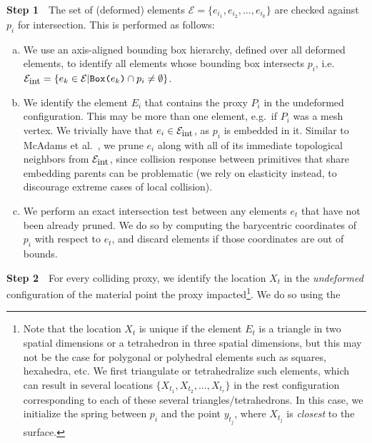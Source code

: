 \textbf{Step 1}\ \ The set of (deformed) elements $\mathcal
  E=\{e_{i_1},e_{i_2},\ldots,e_{i_k}\}$ are checked against $p_i$ for intersection. This is performed as follows:

  \begin{enumerate}[(a)]
    \vspace*{-.07in}\item We use an axis-aligned bounding box
    hierarchy, defined over all deformed elements, to identify all
    elements whose bounding box intersects $p_i$, i.e.\
    $\mathcal{E}_{\mbox{\small
        int}}=\{e_k\in\mathcal{E}|\texttt{Box(}e_k\texttt{)}\cap
    p_i\neq\emptyset\}$.

    \vspace*{-.07in}\item We identify the element $E_i$ that contains the proxy
    $P_i$ in the undeformed configuration. This may be more than one element,
    e.g.\ if $P_i$ was a mesh vertex. We trivially have that
    $e_i\in\mathcal{E}_{\mbox{\small int}}$, as $p_i$ is embedded in it.
    Similar to McAdams et al.~\shortcite{McAdaZSETTS:2011}, we prune $e_i$ along with all of its immediate topological neighbors from
    $\mathcal{E}_{\mbox{\small int}}$, since collision response between
    primitives that share embedding parents can be problematic (we rely on
    elasticity instead, to discourage extreme cases of local collision).


    \vspace*{-.07in}\item We perform an exact intersection test
    between any elements $e_t$ that have not been already pruned. We
    do so by computing the barycentric coordinates of $p_i$ with
    respect to $e_t$, and discard elements if those coordinates are
    out of bounds.

  \end{enumerate}
  \vspace*{-.07in} \textbf{Step 2}\ \ For every colliding proxy, we
  identify the location $X_t$ in the \emph{undeformed} configuration
  of the material point the proxy impacted\footnote{Note that the location $X_t$ is unique if the element
$E_t$ is a triangle in two spatial dimensions or a tetrahedron in
three spatial dimensions, but this may not be the case for polygonal
or polyhedral elements such as squares, hexahedra, etc. We first
triangulate or tetrahedralize such elements, which can result in
several locations $\{X_{t_1},X_{t_2},\ldots,X_{t_r}\}$ in the rest
configuration corresponding to each of these several
triangles/tetrahedrons. In this case, we initialize the spring between
$p_i$ and the point $y_{t_j}$, where $X_{t_j}$ is \emph{closest} to
the surface.}. We do so using the

